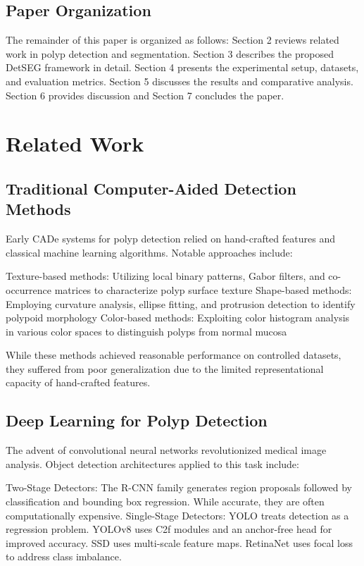 \documentclass[11pt,a4paper]{article}
\begin{document}
\subsection{Paper Organization}
The remainder of this paper is organized as follows: Section 2 reviews related work in polyp detection and segmentation. Section 3 describes the proposed DetSEG framework in detail. Section 4 presents the experimental setup, datasets, and evaluation metrics. Section 5 discusses the results and comparative analysis. Section 6 provides discussion and Section 7 concludes the paper.

\section{Related Work}

\subsection{Traditional Computer-Aided Detection Methods}
Early CADe systems for polyp detection relied on hand-crafted features and classical machine learning algorithms. Notable approaches include:

Texture-based methods: Utilizing local binary patterns, Gabor filters, and co-occurrence matrices to characterize polyp surface texture
Shape-based methods: Employing curvature analysis, ellipse fitting, and protrusion detection to identify polypoid morphology
Color-based methods: Exploiting color histogram analysis in various color spaces to distinguish polyps from normal mucosa

While these methods achieved reasonable performance on controlled datasets, they suffered from poor generalization due to the limited representational capacity of hand-crafted features.

\subsection{Deep Learning for Polyp Detection}
The advent of convolutional neural networks revolutionized medical image analysis. Object detection architectures applied to this task include:

Two-Stage Detectors: The R-CNN family generates region proposals followed by classification and bounding box regression. While accurate, they are often computationally expensive.
Single-Stage Detectors: YOLO treats detection as a regression problem. YOLOv8 uses C2f modules and an anchor-free head for improved accuracy. SSD uses multi-scale feature maps. RetinaNet uses focal loss to address class imbalance.
\end{document}
